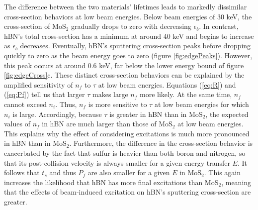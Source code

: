 \documentclass{article}
\begin{document}
The difference between the two materials' lifetimes leads to markedly
dissimilar cross-section behaviors at low beam energies.
Below beam energies of 30 keV, the cross-section of MoS$_2$ gradually drops to
zero with decreasing $\epsilon_b$.
In contrast, hBN's total cross-section has a minimum at around 40 keV and
begins to increase as $\epsilon_b$ decreases.
Eventually, hBN's sputtering cross-section peaks before dropping quickly to
zero as the beam energy goes to zero (figure \ref{fig:edgePeaks}).
However, this peak occurs at around 0.6 keV, far below the lower energy bound
of figure \ref{fig:edgeCross}c.
These distinct cross-section behaviors can be explained by the amplified
sensitivity of $n_f$ to $\tau$ at low beam energies.
Equations (\ref{eq:R}) and (\ref{eq:Pf}) tell us that larger $\tau$
makes large $n_f$ more likely.
At the same time, $n_f$ cannot exceed $n_i$.
Thus, $n_f$ is more sensitive to $\tau$ at low beam energies for which $n_i$ is
large.
Accordingly, because $\tau$ is greater in hBN than in MoS$_2$, the expected
values of $n_f$ in hBN are much larger than those of MoS$_2$ at low beam
energies.
This explains why the effect of considering excitations is much more
pronounced in hBN than in MoS$_2$.
Furthermore, the difference in the cross-section behavior is exacerbated by the
fact that sulfur is heavier than both boron and nitrogen, so that its
post-collision velocity is always smaller for a given energy transfer $E$.
It follows that $t_s$ and thus $P_f$ are also smaller for a given $E$ in
MoS$_2$.
This again increases the likelihood that hBN has more final excitations than
MoS$_2$, meaning that the effects of beam-induced excitation on hBN's
sputtering cross-section are greater.
\end{document}
